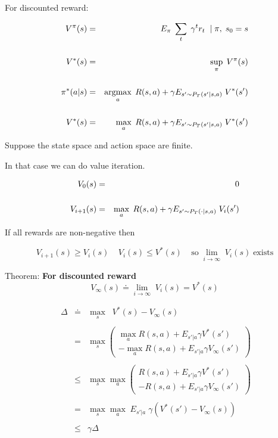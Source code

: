 {

For discounted reward:

\begin{eqnarray*}
  V^\pi(s) & = & E_\pi\;\sum_t \;\gamma^t r_t  \;\;|\; \pi, \; s_0 = s \\
  \\
  V^*(s) & = & \sup_\pi \;V^\pi(s) \\
  \\
  \pi^*(a|s) & = & \operatorname*{argmax}_a\;R(s,a) + \gamma E_{s' \sim P_T(s'|s,a)}\;V^*(s') \\
  \\
  V^*(s) & = & \max_a\; R(s,a) + \gamma E_{s' \sim P_T(s'|s,a)}\;V^*(s')
\end{eqnarray*}


Suppose the state space and action space are finite.

\vfill
In that case we can do value iteration.

\begin{eqnarray*}
  V_0(s) & = & 0 \\
  \\
  V_{i+1}(s) & = & \max_a\; R(s,a) + \gamma E_{s' \sim P_T(\cdot|s,a)}\;V_i(s')
\end{eqnarray*}

\vfill
If all rewards are non-negative then

$$V_{i+1}(s) \geq V_i(s)\;\;\;\;V_i(s) \leq V^*(s)\;\;\;\;\mathrm{so}\;\lim_{i \rightarrow \infty}\;V_i(s)\;\mathrm{exists}$$


Theorem: {\bf For discounted reward}
\vfill
$$V_\infty(s) \doteq \lim_{i \rightarrow \infty}\;V_i(s) = V^*(s)$$


\begin{eqnarray*}
  \;\Delta & \doteq & \max_s\;\;V^*(s) - V_\infty(s) \\
  \\
  & = & \max_s \left(\begin{array}{l} \max_a R(s,a) + E_{s'|a} \gamma V^*(s') \\ - \max_a R(s,a) + E_{s'|a} \gamma V_\infty(s')\end{array}\right) \\
  \\
    & \leq & \max_s \max_a \left(\begin{array}{l} R(s,a) + E_{s'|a} \gamma V^*(s') \\ - R(s,a) + E_{s'|a} \gamma V_\infty(s')\end{array}\right) \\
  \\
  & = & \max_s \max_a \;E_{s'|a}\; \gamma (V^*(s') - V_\infty(s)) \\
  \\  
  & \leq & \gamma \Delta
\end{eqnarray*}



}



